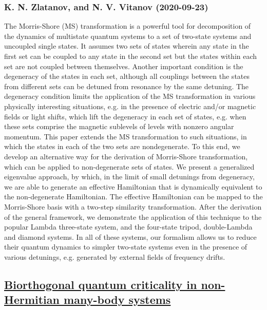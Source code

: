 \subsubsection*{K. N. Zlatanov, and N. V. Vitanov (2020-09-23)}
The Morris-Shore (MS) transformation is a powerful tool for decomposition of
the dynamics of multistate quantum systems to a set of two-state systems and
uncoupled single states. It assumes two sets of states wherein any state in the
first set can be coupled to any state in the second set but the states within
each set are not coupled between themselves. Another important condition is the
degeneracy of the states in each set, although all couplings between the states
from different sets can be detuned from resonance by the same detuning. The
degeneracy condition limits the application of the MS transformation in various
physically interesting situations, e.g. in the presence of electric and/or
magnetic fields or light shifts, which lift the degeneracy in each set of
states, e.g. when these sets comprise the magnetic sublevels of levels with
nonzero angular momentum. This paper extends the MS transformation to such
situations, in which the states in each of the two sets are nondegenerate. To
this end, we develop an alternative way for the derivation of Morris-Shore
transformation, which can be applied to non-degenerate sets of states. We
present a generalized eigenvalue approach, by which, in the limit of small
detunings from degeneracy, we are able to generate an effective Hamiltonian
that is dynamically equivalent to the non-degenerate Hamiltonian. The effective
Hamiltonian can be mapped to the Morris-Shore basis with a two-step similarity
transformation. After the derivation of the general framework, we demonstrate
the application of this technique to the popular Lambda three-state system, and
the four-state tripod, double-Lambda and diamond systems. In all of these
systems, our formalism allows us to reduce their quantum dynamics to simpler
two-state systems even in the presence of various detunings, e.g. generated by
external fields of frequency drifts.

\subsection*{\href{http://arxiv.org/abs/2009.11183v1}{Biorthogonal quantum criticality in non-Hermitian many-body systems}}
